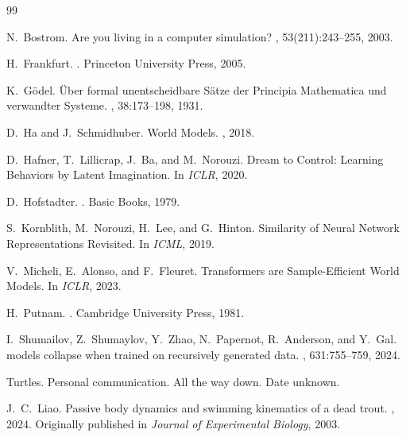 \documentclass[11pt, twocolumn]{article}
\begin{document}


\begin{thebibliography}{99}

N.~Bostrom.
\newblock Are you living in a computer simulation?
, 53(211):243--255, 2003.

H.~Frankfurt.
.
\newblock Princeton University Press, 2005.

K.~G\"{o}del.
\newblock \"{U}ber formal unentscheidbare S\"{a}tze der {P}rincipia {M}athematica und verwandter {S}ysteme.
, 38:173--198, 1931.

D.~Ha and J.~Schmidhuber.
\newblock World Models.
, 2018.

D.~Hafner, T.~Lillicrap, J.~Ba, and M.~Norouzi.
\newblock Dream to Control: Learning Behaviors by Latent Imagination.
\newblock In {\em ICLR}, 2020.

D.~Hofstadter.
.
\newblock Basic Books, 1979.

S.~Kornblith, M.~Norouzi, H.~Lee, and G.~Hinton.
\newblock Similarity of Neural Network Representations Revisited.
\newblock In {\em ICML}, 2019.

V.~Micheli, E.~Alonso, and F.~Fleuret.
\newblock Transformers are Sample-Efficient World Models.
\newblock In {\em ICLR}, 2023.

H.~Putnam.
.
\newblock Cambridge University Press, 1981.

I.~Shumailov, Z.~Shumaylov, Y.~Zhao, N.~Papernot, R.~Anderson, and Y.~Gal.
 models collapse when trained on recursively generated data.
, 631:755--759, 2024.

Turtles.
\newblock Personal communication. All the way down. Date unknown.

J.~C.~Liao.
\newblock Passive body dynamics and swimming kinematics of a dead trout.
, 2024. Originally published in {\em Journal of Experimental Biology}, 2003.


\end{thebibliography}
\end{document}
